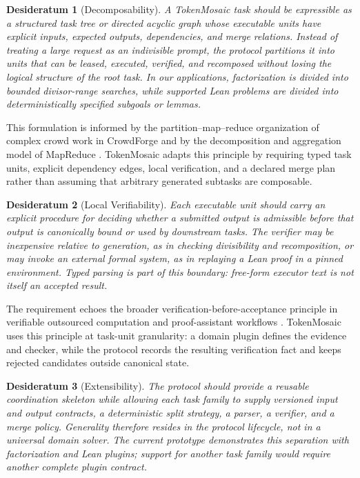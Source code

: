 \documentclass{article}
\theoremstyle{plain}
\newtheorem{desideratum}{Desideratum}
\begin{document}
\begin{desideratum}[Decomposability]
A TokenMosaic task should be expressible as a structured task tree or directed
acyclic graph whose executable units have explicit inputs, expected outputs,
dependencies, and merge relations. Instead of treating a large request as an
indivisible prompt, the protocol partitions it into units that can be leased,
executed, verified, and recomposed without losing the logical structure of the
root task. In our applications, factorization is divided into bounded
divisor-range searches, while supported Lean problems are divided into
deterministically specified subgoals or lemmas.
\end{desideratum}

This formulation is informed by the partition--map--reduce organization of
complex crowd work in CrowdForge and by the decomposition and aggregation model
of MapReduce \citep{kittur2011crowdforge,dean2004mapreduce}. TokenMosaic adapts
this principle by requiring typed task units, explicit dependency edges, local
verification, and a declared merge plan rather than assuming that arbitrary
generated subtasks are composable.


\begin{desideratum}[Local Verifiability]
Each executable unit should carry an explicit procedure for deciding whether a
submitted output is admissible before that output is canonically bound or used
by downstream tasks. The verifier may be inexpensive relative to generation,
as in checking divisibility and recomposition, or may invoke an external formal
system, as in replaying a Lean proof in a pinned environment. Typed parsing is
part of this boundary: free-form executor text is not itself an accepted result.
\end{desideratum}


The requirement echoes the broader verification-before-acceptance principle in
verifiable outsourced computation and proof-assistant workflows
\citep{teutsch2019truebit,mathlib2020,yang2023leandojo}. TokenMosaic uses this
principle at task-unit granularity: a domain plugin defines the evidence and
checker, while the protocol records the resulting verification fact and keeps
rejected candidates outside canonical state.


\begin{desideratum}[Extensibility]
The protocol should provide a reusable coordination skeleton while allowing
each task family to supply versioned input and output contracts, a deterministic
split strategy, a parser, a verifier, and a merge policy. Generality therefore
resides in the protocol lifecycle, not in a universal domain solver. The current
prototype demonstrates this separation with factorization and Lean plugins;
support for another task family would require another complete plugin contract.
\end{desideratum}
\end{document}
